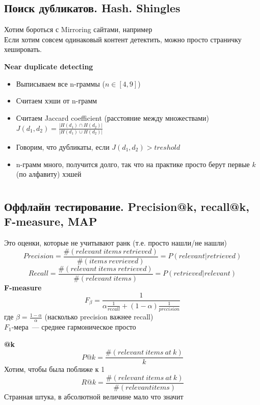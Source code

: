 \documentclass[12pt]{article}
\begin{document}
  \subsection{Поиск дубликатов. Hash. Shingles}
    Хотим бороться с Mirroring сайтами, например\\
    Если хотим совсем одинаковый контент детектить, можно просто страничку хешировать.

    \smallskip
    \smallskip
    {\bf Near duplicate detecting}
    \begin{itemize}
      \item Выписываем все n-граммы ($n \in [4, 9]$)
      \item Считаем хэши от n-грамм
      \item Считаем Jaccard coefficient (расстояние между множествами)\\
      $J(d_1, d_2) = \frac{|H(d_1) \cap H(d_2)|}{|H(d_1) \cup H(d_2)|}$ 
      \item Говорим, что дубликаты, если $J(d_1, d_2) > treshold$
      \item n-грамм много, получится долго, так что на практике просто берут первые $k$ (по алфавиту) хэшей
    \end{itemize}

\pagebreak %

\section{} %

  \subsection{Оффлайн тестирование. Precision@k, recall@k, F-measure, MAP}
    Это оценки, которые не учитывают ранк (т.е. просто нашли/не нашли)\\
    $$Precision = \frac{\#(relevant~items~retrieved)}{\#(items~revrieved)} = P(relevant|retrieved)$$
    $$Recall = \frac{\#(relevant~items~retrieved)}{\#(relevant~items)} = P(retrieved|relevant)$$
    \smallskip \smallskip
    {\bf F-measure}
    $$F_{\beta} = \frac{1}{\alpha \frac{1}{recall} + (1 - \alpha) \frac{1}{precision}}$$
    где $\beta = \frac{1 - \alpha}{\alpha}$ (насколько precision важнее recall)\\
    $F_1$-мера~--- среднее гармоническое просто

    \smallskip \smallskip
    {\bf @k}
    $$P@k = \frac{\#(relevant~items~at~k)}{k}$$
    Хотим, чтобы была поближе к 1
    $$R@k = \frac{\#(relevant~items~at~k)}{\#(relevant items)}$$
    Странная штука, в абсолютной величине мало что значит
\end{document}

